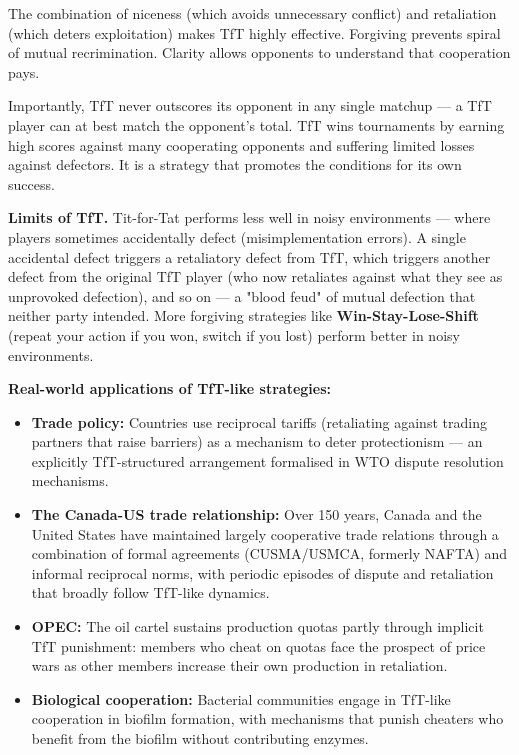 \documentclass[12pt, letterpaper]{article}
\begin{document}
The combination of niceness (which avoids unnecessary conflict) and retaliation (which deters exploitation) makes TfT highly effective. Forgiving prevents spiral of mutual recrimination. Clarity allows opponents to understand that cooperation pays.

Importantly, TfT never outscores its opponent in any single matchup --- a TfT player can at best match the opponent's total. TfT wins tournaments by earning high scores against many cooperating opponents and suffering limited losses against defectors. It is a strategy that promotes the conditions for its own success.

\textbf{Limits of TfT.} Tit-for-Tat performs less well in noisy environments --- where players sometimes accidentally defect (misimplementation errors). A single accidental defect triggers a retaliatory defect from TfT, which triggers another defect from the original TfT player (who now retaliates against what they see as unprovoked defection), and so on --- a "blood feud" of mutual defection that neither party intended. More forgiving strategies like \textbf{Win-Stay-Lose-Shift} (repeat your action if you won, switch if you lost) perform better in noisy environments.

\textbf{Real-world applications of TfT-like strategies:}
\begin{itemize}
\item \textbf{Trade policy:} Countries use reciprocal tariffs (retaliating against trading partners that raise barriers) as a mechanism to deter protectionism --- an explicitly TfT-structured arrangement formalised in WTO dispute resolution mechanisms.
\item \textbf{The Canada-US trade relationship:} Over 150 years, Canada and the United States have maintained largely cooperative trade relations through a combination of formal agreements (CUSMA/USMCA, formerly NAFTA) and informal reciprocal norms, with periodic episodes of dispute and retaliation that broadly follow TfT-like dynamics.
\item \textbf{OPEC:} The oil cartel sustains production quotas partly through implicit TfT punishment: members who cheat on quotas face the prospect of price wars as other members increase their own production in retaliation.
\item \textbf{Biological cooperation:} Bacterial communities engage in TfT-like cooperation in biofilm formation, with mechanisms that punish cheaters who benefit from the biofilm without contributing enzymes.
\end{itemize}
\end{document}
